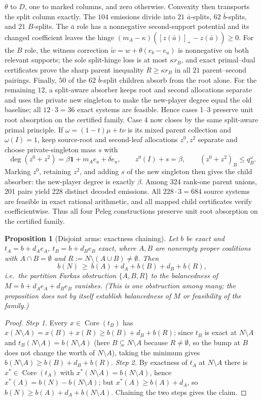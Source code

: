 \documentclass[11pt]{article}
\newtheorem{proposition}[theorem]{Proposition}
\newcommand{\core}{\operatorname{Core}}
\begin{document}
$\theta$ to $D$, one to marked columns, and zero otherwise.  Convexity then
transports the split column exactly.  The $104$ emissions divide into $21$
$\bar a$-splits, $62$ $\bar b$-splits, and $21$ $B$-splits.  The
$\bar a$ role has a nonnegative second-support potential and its changed
coefficient leaves the hinge
$(m_A-\kappa)([z(\bar a)]_+-z(\bar a))\ge0$.  For the $B$ role, the witness
correction $\widetilde w=w+\theta(e_b-e_u)$ is nonnegative on both relevant
supports; the sole split-hinge loss is at most $\kappa r_B$, and exact
primal--dual certificates prove the sharp parent inequality
$R\ge\kappa r_B$ in all $21$ parent--second pairings.  Finally, $50$ of the
$62$ $\bar b$-split children absorb from the root alone.  For the remaining
$12$, a split-aware absorber keeps root and second allocations separate and
uses the private new singleton to make the new-player degree equal the old
baseline; all $12\cdot3=36$ exact systems are feasible.  Hence cases 1--3
preserve unit root absorption on the certified family.  Case 4 now closes by
the same split-aware primal principle.  If
$\omega=(1-t)\mu+t\nu$ is its mixed parent collection and
$\omega(I)=1$, keep source-root and second-leaf allocations $z^0,z^2$
separate and choose private-singleton mass $s$ with
\[
 \deg(z^0+z^2)=\beta\mathbf1+m_Ae_a+\delta e_u,
 \qquad z^0(I)+s=\beta,
 \qquad (z^0+z^2)_B\le q^\omega_B.
\]
Marking $z^0$, retaining $z^2$, and adding $s$ of the new singleton then
gives the child absorber: the new-player degree is exactly $\beta$.  Among
324 rank-one parent unions, 201 pairs yield 228 distinct decoded emissions.
All $228\cdot3=684$ source systems are feasible in exact rational arithmetic,
and all mapped child certificates verify coefficientwise.  Thus all four
Peleg constructions preserve unit root absorption on the certified family.

\begin{proposition}[Disjoint arms: exactness chaining]\label{prop:disjoint}
Let $b$ be exact and $t_A=b+d_Ae_A$, $t_B=b+d_Be_B$ exact, where $A,B$ are
nonempty proper coalitions with $A\cap B=\emptyset$ and
$R:=N\setminus(A\cup B)\neq\emptyset$. Then
\[
b(N)\ \ge\ b(A)+d_A+b(B)+d_B+b(R),
\]
i.e.\ the partition Farkas obstruction $\{A,B,R\}$ to the balancedness of
$M=b+d_Ae_A+d_Be_B$ vanishes. (This is one obstruction among many; the
proposition does not by itself establish balancedness of $M$ or feasibility
of the family.)
\end{proposition}

\begin{proof}
\emph{Step 1.} Every $x\in\core(t_B)$ has
$x(N\setminus A)=x(B)+x(R)\ge b(B)+d_B+b(R)$; since $t_B$ is exact at
$N\setminus A$ and $t_B(N\setminus A)=b(N\setminus A)$ (here
$B\subsetneq N\setminus A$ because $R\neq\emptyset$, so the bump at $B$ does
not change the worth of $N\setminus A$), taking the minimum gives
$b(N\setminus A)\ge b(B)+d_B+b(R)$.
\emph{Step 2.} By exactness of $t_A$ at $N\setminus A$ there is
$x^*\in\core(t_A)$ with $x^*(N\setminus A)=b(N\setminus A)$, hence
$x^*(A)=b(N)-b(N\setminus A)$; but $x^*(A)\ge b(A)+d_A$, so
$b(N)\ge b(A)+d_A+b(N\setminus A)$. Chaining the two steps gives the claim.
\end{proof}
\end{document}
